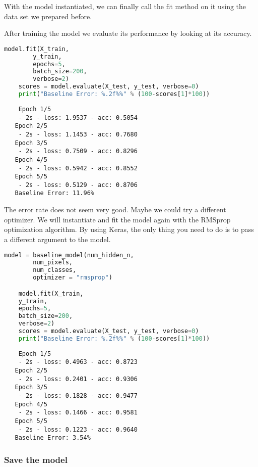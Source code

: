 With the model instantiated, we can finally call the fit method on it using the data set we prepared before.

After training the model we evaluate its performance by looking at its accuracy.

\begin{lstlisting}[language=Python]
    model.fit(X_train,
        y_train, 
        epochs=5,
        batch_size=200,
        verbose=2)
    scores = model.evaluate(X_test, y_test, verbose=0)
    print("Baseline Error: %.2f%%" % (100-scores[1]*100))
\end{lstlisting}

\begin{lstlisting}
    Epoch 1/5
    - 2s - loss: 1.9537 - acc: 0.5054
   Epoch 2/5
    - 2s - loss: 1.1453 - acc: 0.7680
   Epoch 3/5
    - 2s - loss: 0.7509 - acc: 0.8296
   Epoch 4/5
    - 2s - loss: 0.5942 - acc: 0.8552
   Epoch 5/5
    - 2s - loss: 0.5129 - acc: 0.8706
   Baseline Error: 11.96%
\end{lstlisting}

The error rate does not seem very good. Maybe we could try a different optimizer. We will instantiate and fit the model again with the RMSprop optimization algorithm. By using Keras, the only thing you need to do is to pass a different argument to the model.

\begin{lstlisting}[language=Python]
    model = baseline_model(num_hidden_n,
        num_pixels,
        num_classes,
        optimizer = "rmsprop")

    model.fit(X_train,
    y_train, 
    epochs=5,
    batch_size=200,
    verbose=2)
    scores = model.evaluate(X_test, y_test, verbose=0)
    print("Baseline Error: %.2f%%" % (100-scores[1]*100))
\end{lstlisting}

\begin{lstlisting}
    Epoch 1/5
    - 2s - loss: 0.4963 - acc: 0.8723
   Epoch 2/5
    - 2s - loss: 0.2401 - acc: 0.9306
   Epoch 3/5
    - 2s - loss: 0.1828 - acc: 0.9477
   Epoch 4/5
    - 2s - loss: 0.1466 - acc: 0.9581
   Epoch 5/5
    - 2s - loss: 0.1223 - acc: 0.9640
   Baseline Error: 3.54%   
\end{lstlisting}

\subsubsection{Save the model}


